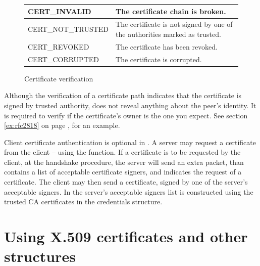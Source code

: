 \begin{figure}[hbtp]
\begin{tabular}{|l|p{9cm}|}

\hline
CERT\_INVALID & The certificate chain is broken. 
\\
\hline
CERT\_NOT\_TRUSTED & The certificate is not signed by one of the authorities marked as trusted.
\\
\hline
CERT\_REVOKED & The certificate has been revoked.
\\
\hline
CERT\_CORRUPTED & The certificate is corrupted.
\\
\hline
\end{tabular}
\caption{Certificate verification}
\label{fig:verify}
\end{figure}

\par
Although the verification of a certificate path indicates that the
certificate is signed by trusted authority, does not reveal anything
about the peer's identity. It is required to verify if the certificate's
owner is the one you expect. See section \ref{ex:rfc2818} on page \pageref{ex:rfc2818},
for an example.

\par
Client certificate authentication is 
optional in \tls{}. A server may request a certificate from the client -- using the
function. If a certificate is to be requested by the client, at the handshake 
procedure, the server will send an extra packet,
than contains a list of acceptable certificate signers, and indicates the
request of a certificate. The client may then send a certificate, signed
by one of the server's acceptable signers. In \gnutls{} the server's acceptable
signers list is constructed using the trusted CA certificates in the
credentials structure.

\section{Using X.509 certificates and other structures}

